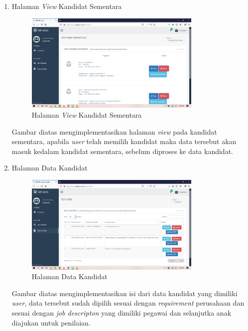 \begin{enumerate}
	\item Halaman \textit{View} Kandidat Sementara
	\begin{figure}
		\centering
		\includegraphics[width=0.8\textwidth]
		{pics/user/implementasi/viewcart.png}
		\caption{Halaman \textit{View} Kandidat Sementara}
		\label{fig:CC10}
	\end{figure}
	
	Gambar diatas mengimplementasikan halaman \textit{view }pada kandidat sementara, apabila \textit{user} telah memilih kandidat maka data tersebut akan masuk kedalam kandidat sementara, sebelum diproses ke data kandidat. 
	
	\newpage
		\item Halaman Data Kandidat
	\begin{figure}
		\centering
		\includegraphics[width=0.8\textwidth]
		{pics/user/implementasi/datatallent.png}
		\caption{Halaman Data Kandidat}
		\label{fig:CC10}
	\end{figure}
	
	Gambar diatas mengimplementasikan isi dari  data kandidat yang dimiliki \textit{user}, data tersebut sudah dipilih sesuai dengan \textit{requirement} perusahaan dan sesuai dengan \textit{job descripton} yang dimiliki pegawai dan selanjutka anak diajukan untuk penilaian.
	
\end{enumerate}

